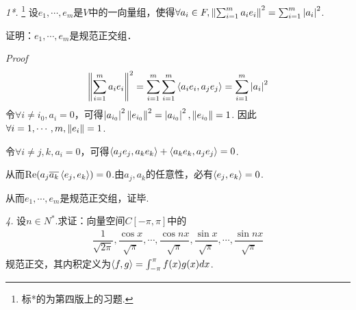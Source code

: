 \newpage

\textit{1*.} \footnote{标*的为第四版上的习题.}
设\(e_1,\cdots,e_m\)是\(V\)中的一向量组，使得\(\forall a_i \in F,\left\lVert \sum_{i=1}^m a_ie_i \right\rVert^2=\sum_{i=1}^m \left\lvert a_i \right\rvert^2\).

证明：\(e_1,\cdots,e_m\)是规范正交组．

\textit{Proof}
    \begin{align*}
        \left\lVert \sum_{i=1}^m a_ie_i \right\rVert^2=\sum_{i=1}^m \sum_{i=1}^m \left\langle a_ie_i,a_je_j \right\rangle=\sum_{i=1}^m \left\lvert a_i \right\rvert^2
    \end{align*}
令\(\forall i \ne i_0,a_i=0\)，可得\(\left\lvert a_{i_0} \right\rvert^2\left\lVert e_{i_0} \right\rVert^2=\left\lvert a_{i_0} \right\rvert^2,\left\lVert e_{i_0} \right\rVert=1\).
因此\(\forall i=1,\cdots,m,\left\lVert e_i \right\rVert=1\).

令\(\forall i \ne j,k,a_i=0\)，可得\(\left\langle a_je_j,a_ke_k \right\rangle+\left\langle a_ke_k,a_je_j \right\rangle=0\).

从而\(\mathrm{Re}(a_j\overline{a_k}\left\langle e_j,e_k \right\rangle)=0\).由\(a_j,a_k\)的任意性，必有\(\left\langle e_j,e_k \right\rangle=0\).

从而\(e_1,\cdots,e_m\)是规范正交组，证毕.

\hspace*{\fill}

\textit{4.}
设\(n \in N^*\).求证：向量空间\(C[-\pi,\pi]\)中的
    \begin{align*}
        \dfrac{1}{\sqrt{2\pi}},\dfrac{\cos x}{\sqrt{\pi}},\cdots,\dfrac{\cos nx}{\sqrt{\pi}},
        \dfrac{\sin x}{\sqrt{\pi}},\cdots,\dfrac{\sin nx}{\sqrt{\pi}}
    \end{align*}
规范正交，其内积定义为\(\left\langle f,g \right\rangle=\int_{-\pi}^{\pi}f(x)g(x)dx\).

